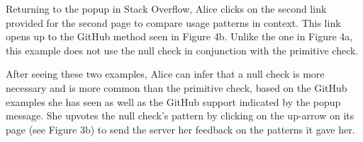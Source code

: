 Returning to the popup in Stack Overflow, Alice clicks on the second link provided for the second page to compare usage patterns in context. This link opens up to the GitHub method seen in Figure 4b. Unlike the one in Figure 4a, this example does not use the null check in conjunction with the primitive check. 

After seeing these two examples, Alice can infer that a null check is more necessary and is more common than the primitive check, based on the GitHub examples she has seen as well as the GitHub support indicated by the popup message. She upvotes the null check's pattern by clicking on the up-arrow on its page (see Figure 3b) to send the server her feedback on the patterns it gave her. 

